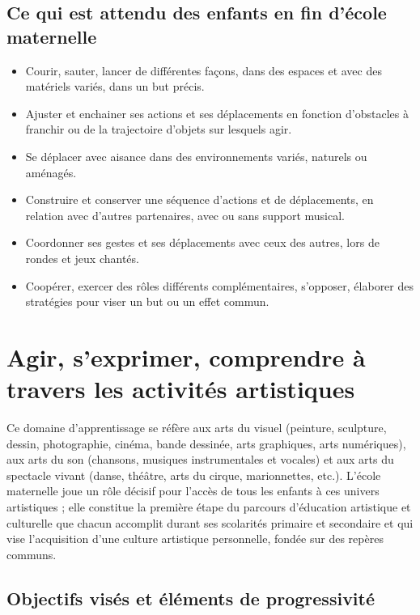\section{Ce qui est attendu des enfants en fin d’école maternelle}
\begin{itemize}
\item Courir, sauter, lancer de différentes façons, dans des espaces et avec des matériels variés, dans un but précis. 
\item Ajuster et enchainer ses actions et ses déplacements en fonction d’obstacles à franchir ou de la trajectoire d’objets sur lesquels agir.
\item Se déplacer avec aisance dans des environnements variés, naturels ou aménagés. 
\item Construire et conserver une séquence d’actions et de déplacements, en relation avec d’autres partenaires, avec ou sans support musical.
\item Coordonner ses gestes et ses déplacements avec ceux des autres, lors de rondes et jeux chantés.
\item Coopérer, exercer des rôles différents complémentaires, s’opposer, élaborer des stratégies pour viser un but ou un effet commun. 
\end{itemize}

\chapter{Agir, s’exprimer, comprendre à travers les activités artistiques}
Ce domaine d’apprentissage se réfère aux arts du visuel (peinture, sculpture, dessin, photographie, cinéma, bande dessinée, arts graphiques, arts numériques), aux arts du son (chansons, musiques instrumentales et vocales) et aux arts du spectacle vivant (danse, théâtre, arts du cirque, marionnettes, etc.). L’école maternelle joue un rôle décisif pour l’accès de tous les enfants à ces univers artistiques ; elle constitue la première étape du parcours d’éducation artistique et culturelle que chacun accomplit durant ses scolarités primaire et secondaire et qui vise l’acquisition d’une culture artistique personnelle, fondée sur des repères communs. 

\section{Objectifs visés et éléments de progressivité}
